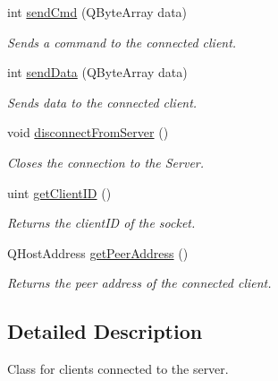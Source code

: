 \begin{DoxyCompactItemize}
int \hyperlink{class_network_1_1_connected_client_a4d4d24c1fb549997efdc0e6d3f336206}{send\+Cmd} (Q\+Byte\+Array data)
\begin{DoxyCompactList}\small\item\em Sends a command to the connected client. \end{DoxyCompactList}\item 
int \hyperlink{class_network_1_1_connected_client_a8ed4284d7f5187ebcf16a1dd8db07622}{send\+Data} (Q\+Byte\+Array data)
\begin{DoxyCompactList}\small\item\em Sends data to the connected client. \end{DoxyCompactList}\item 
void \hyperlink{class_network_1_1_connected_client_a64c600f1673753092cd6eaa24a67081a}{disconnect\+From\+Server} ()
\begin{DoxyCompactList}\small\item\em Closes the connection to the Server. \end{DoxyCompactList}\item 
uint \hyperlink{class_network_1_1_connected_client_a97812f8788cc3635edceeb0b6202f19b}{get\+Client\+I\+D} ()
\begin{DoxyCompactList}\small\item\em Returns the client\+I\+D of the socket. \end{DoxyCompactList}\item 
Q\+Host\+Address \hyperlink{class_network_1_1_connected_client_a7e0ba50bdccd46a6c3a2a4a2f07e95f1}{get\+Peer\+Address} ()
\begin{DoxyCompactList}\small\item\em Returns the peer address of the connected client. \end{DoxyCompactList}\end{DoxyCompactItemize}


\subsection{Detailed Description}
Class for clients connected to the server. 

